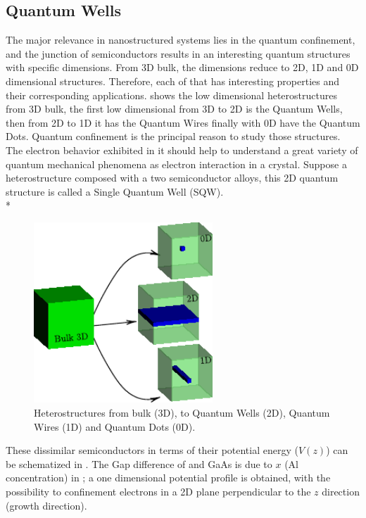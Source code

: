 \subsection{Quantum Wells}
\label{subsection:chapter-1-quantum-wells}
\vspace{-10mm} 
The major relevance in nanostructured systems lies in the quantum confinement, and 
the junction of semiconductors results in an interesting quantum structures with specific
dimensions. From 3D bulk, the dimensions reduce to 2D, 1D and 0D dimensional structures.
Therefore, each of that has interesting properties and their corresponding applications. 
 shows the low dimensional heterostructures from 3D bulk, the first low dimensional from 3D to 2D is the Quantum Wells, then from 2D to 1D it has the
Quantum Wires finally with 0D have the Quantum Dots. Quantum confinement is the principal reason to study those structures. The electron behavior exhibited in it should help to understand a great variety of quantum mechanical phenomena as electron interaction in a crystal. Suppose a heterostructure composed with a two
semiconductor alloys, this 2D quantum structure is called a Single Quantum
Well (SQW).\\*
\begin{figure}
	\centering
	\includegraphics[width=0.6\textwidth]{../figures/chapter-1/heterostructures/build-ruco/lds-00}
	\caption{Heterostructures from bulk (3D), to Quantum Wells (2D), Quantum Wires (1D) and Quantum Dots (0D).  }
	\label{fig:subsection-1.2-heterostructures}
\end{figure}
These  dissimilar semiconductors in terms of their potential energy ($V(z)$) can be schematized in . The Gap difference of \algaas and GaAs is due to $x$ (Al concentration) in \algaas;  a one dimensional potential profile is obtained, with the possibility to confinement electrons in a 2D plane perpendicular to the  $z$ direction (growth direction). 
